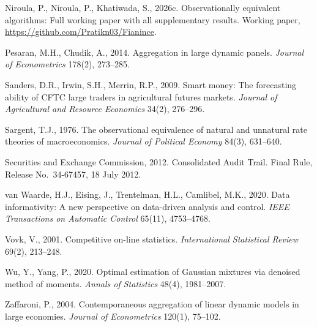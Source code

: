 \documentclass[11pt,letterpaper]{article}
\theoremstyle{definition}
\begin{document}
\begin{list}{}{\small\setlength{\leftmargin}{1.8em}\setlength{\itemindent}{-1.8em}\setlength{\itemsep}{3pt}\setlength{\parsep}{0pt}}
\item Niroula, P., Niroula, P., Khatiwada, S., 2026c. Observationally equivalent algorithms: Full working paper with all supplementary results. Working paper, \url{https://github.com/Pratikn03/Fianince}.

\item Pesaran, M.H., Chudik, A., 2014. Aggregation in large dynamic panels. \emph{Journal of Econometrics} 178(2), 273--285.

\item Sanders, D.R., Irwin, S.H., Merrin, R.P., 2009. Smart money: The forecasting ability of CFTC large traders in agricultural futures markets. \emph{Journal of Agricultural and Resource Economics} 34(2), 276--296.

\item Sargent, T.J., 1976. The observational equivalence of natural and unnatural rate theories of macroeconomics. \emph{Journal of Political Economy} 84(3), 631--640.

\item Securities and Exchange Commission, 2012. Consolidated Audit Trail. Final Rule, Release No.\ 34-67457, 18 July 2012.

\item van Waarde, H.J., Eising, J., Trentelman, H.L., Camlibel, M.K., 2020. Data informativity: A new perspective on data-driven analysis and control. \emph{IEEE Transactions on Automatic Control} 65(11), 4753--4768.

\item Vovk, V., 2001. Competitive on-line statistics. \emph{International Statistical Review} 69(2), 213--248.

\item Wu, Y., Yang, P., 2020. Optimal estimation of Gaussian mixtures via denoised method of moments. \emph{Annals of Statistics} 48(4), 1981--2007.

\item Zaffaroni, P., 2004. Contemporaneous aggregation of linear dynamic models in large economies. \emph{Journal of Econometrics} 120(1), 75--102.

\end{list}
\end{document}
